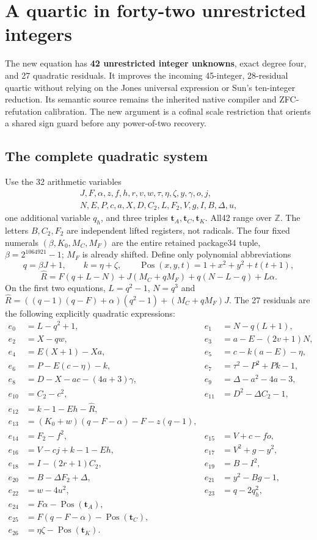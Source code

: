 \section{A quartic in forty-two unrestricted integers}
\label{sec:q42}
The new equation has \textbf{42 unrestricted integer unknowns}, exact degree
four, and 27 quadratic residuals. It improves the incoming 45-integer,
28-residual quartic without relying on the Jones universal expression or
Sun's ten-integer reduction. Its semantic source remains the inherited
native compiler and ZFC-refutation calibration. The new argument is a
cofinal scale restriction that orients a shared sign guard before any
power-of-two recovery.

\subsection{The complete quadratic system}
Use the 32 arithmetic variables
\[
\begin{gathered}
 J,F,\alpha,z,f,h,r,v,w,\tau,\eta,\zeta,y,\gamma,o,j,\\
 N,E,P,c,a,X,D,C_2,L,F_2,V,g,I,B,\Delta,u,
\end{gathered}
\]
one additional variable $q_h$, and three triples
$\mathbf t_A,\mathbf t_C,\mathbf t_K$. All42 range over $\mathbb Z$.
The letters $B,C_2,F_2$ are independent lifted registers, not radicals.
The four fixed numerals $(\beta,K_0,M_C,M_F)$ are the entire retained
package34 tuple, $\beta=2^{1064921}-1$; $M_F$ is already shifted.
Define only polynomial abbreviations
\[
 q=\beta J+1,\qquad k=\eta+\zeta,\qquad
 \operatorname{Pos}(x,y,t)=1+x^2+y^2+t(t+1),
\]
\[
 \widehat R=F(q+L-N)+J(M_C+qM_F)+q(N-L-q)+L\alpha.
\]
On the first two equations, $L=q^2-1$, $N=q^3$ and
$\widehat R=((q-1)(q-F)+\alpha)(q^2-1)+(M_C+qM_F)J$.
The 27 residuals are the following explicitly quadratic expressions:
{\small
\begin{align*}
e_0&=L-q^2+1,& e_1&=N-q(L+1),\\
e_2&=X-qw,& e_3&=a-E-(2v+1)N,\\
e_4&=E(X+1)-Xa,&e_5&=c-k(a-E)-\eta,\\
e_6&=P-E(c-\eta)-k,&e_7&=\tau^2-P^2+Pk-1,\\
e_8&=D-X-ac-(4a+3)\gamma,&e_9&=\Delta-a^2-4a-3,\\
e_{10}&=C_2-c^2,&e_{11}&=D^2-\Delta C_2-1,\\
e_{12}&=k-1-Eh-\widehat R,\\
e_{13}&=(K_0+w)(q-F-\alpha)-F-z(q-1),\\
e_{14}&=F_2-f^2,&e_{15}&=V+c-fo,\\
e_{16}&=V-cj+k-1-Eh,&e_{17}&=V^2+g-y^2,\\
e_{18}&=I-(2r+1)C_2,&e_{19}&=B-I^2,\\
e_{20}&=B-\Delta F_2+\Delta,&e_{21}&=y^2-Bg-1,\\
e_{22}&=w-4u^2,&e_{23}&=q-2q_h^2,\\
e_{24}&=F\alpha-\operatorname{Pos}(\mathbf t_A),\\
e_{25}&=F(q-F-\alpha)-\operatorname{Pos}(\mathbf t_C),\\
e_{26}&=\eta\zeta-\operatorname{Pos}(\mathbf t_K).
\end{align*}}
